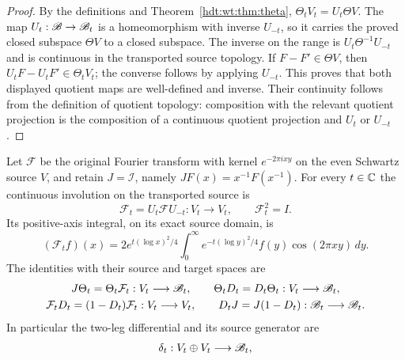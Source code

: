 \documentclass[11pt]{article}
\begin{document}
\begin{proof}
By the definitions and Theorem~\ref{hdt:wt:thm:theta},
$\Theta_tV_t=U_t\Theta V$.  The map $U_t:\mathscr B\to\mathscr B_t$ is a
homeomorphism with inverse $U_{-t}$, so it carries the proved
closed subspace $\Theta V$ to a closed subspace.  The inverse on
the range is $U_t\Theta^{-1}U_{-t}$ and is continuous in the
transported source topology.  If $F-F'\in\Theta V$, then
$U_tF-U_tF'\in\Theta_tV_t$; the converse follows by applying
$U_{-t}$.  This proves that both displayed quotient maps are
well-defined and inverse.  Their continuity follows from the
definition of quotient topology: composition with the relevant
quotient projection is the composition of a continuous quotient
projection and $U_t$ or $U_{-t}$.
\end{proof}

\begin{hdtproposition}
\label{hdt:wt:prop:Fourier-chain}
Let $\mathcal F$ be the original Fourier transform with kernel
$e^{-2\pi ixy}$ on the even Schwartz source $V$, and retain
$J=\mathcal I$, namely $JF(x)=x^{-1}F(x^{-1})$.  For every
$t\in\mathbb C$ the continuous involution on the transported source is
\begin{equation}\label{hdt:wt:eq:Fourier-transport}
 \mathcal F_t=U_t\mathcal F U_{-t}:V_t\longrightarrow V_t,
 \qquad \mathcal F_t^2=I.
\end{equation}
Its positive-axis integral, on its exact source domain, is
\begin{equation}\label{hdt:wt:eq:Fourier-kernel}
 (\mathcal F_tf)(x)=2e^{t(\log x)^2/4}
 \int_0^\infty e^{-t(\log y)^2/4}f(y)\cos(2\pi xy)\,dy.
\end{equation}
The identities with their source and target spaces are
\begin{equation}\label{hdt:wt:eq:Fourier-identities}
 \begin{gathered}
 J\Theta_t=\Theta_t\mathcal F_t:V_t\longrightarrow\mathscr B_t,
 \qquad \Theta_tD_t=D_t\Theta_t:V_t\longrightarrow\mathscr B_t,\\
 \mathcal F_tD_t=(1-D_t)\mathcal F_t:V_t\longrightarrow V_t,
 \qquad D_tJ=J(1-D_t):\mathscr B_t\longrightarrow\mathscr B_t.
 \end{gathered}
\end{equation}
In particular the two-leg differential and its source generator are
\begin{equation}\label{hdt:wt:eq:two-leg}
 \begin{gathered}
 \delta_t:V_t\oplus V_t\longrightarrow\hdtB_t,

\end{gathered}
\end{equation}
\end{hdtproposition}
\end{document}
